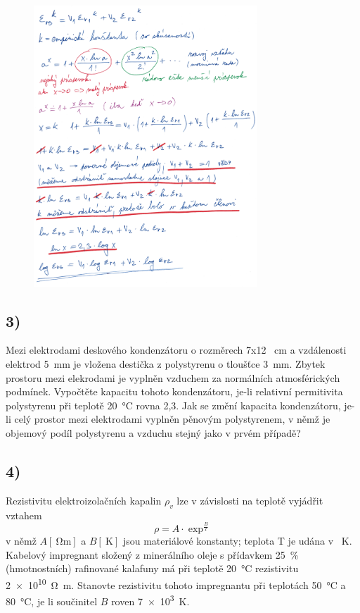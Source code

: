 \begin{figure}[h]
    \centering
    \includegraphics*[width=0.75\textwidth]{images/diel2.jpg}
\end{figure}

\newpage


\subsection*{3)}
Mezi elektrodami deskového kondenzátoru o rozměrech 7x12 \SI{}{\centi\meter} a vzdálenosti elektrod \SI{5}{\milli\meter} je vložena destička z polystyrenu o tloušťce \SI{3}{\milli\meter}. Zbytek prostoru mezi elekrodami je vyplněn vzduchem za normálních atmosférických podmínek. Vypočtěte kapacitu tohoto kondenzátoru, je-li relativní permitivita polystyrenu při teplotě \SI{20}{\degreeCelsius} rovna 2,3. Jak se změní kapacita kondenzátoru, je-li celý prostor mezi elektrodami vyplněn pěnovým polystyrenem, v němž je objemový podíl polystyrenu a vzduchu stejný jako v prvém případě?

\newpage


\subsection*{4)}
Rezistivitu elektroizolačních kapalin $\rho_v$ lze v závislosti na teplotě vyjádřit vztahem
\begin{equation}
    \rho=A\cdot\exp^\frac{B}{T}
\end{equation}
v němž $A [\SI{}{\ohm\meter}]$ a $B [\SI{}{\kelvin}]$ jsou materiálové konstanty; teplota T je udána v \SI{}{\kelvin}. Kabelový impregnant složený z minerálního oleje s přídavkem \SI{25}{\percent} (hmotnostních) rafinované kalafuny má při teplotě \SI{20}{\degreeCelsius} rezistivitu \SI{2e10}{\ohm\meter}. Stanovte rezistivitu tohoto impregnantu při teplotách \SI{50}{\degreeCelsius} a \SI{80}{\degreeCelsius}, je li součinitel $B$ roven \SI{7e3}{\kelvin}.

